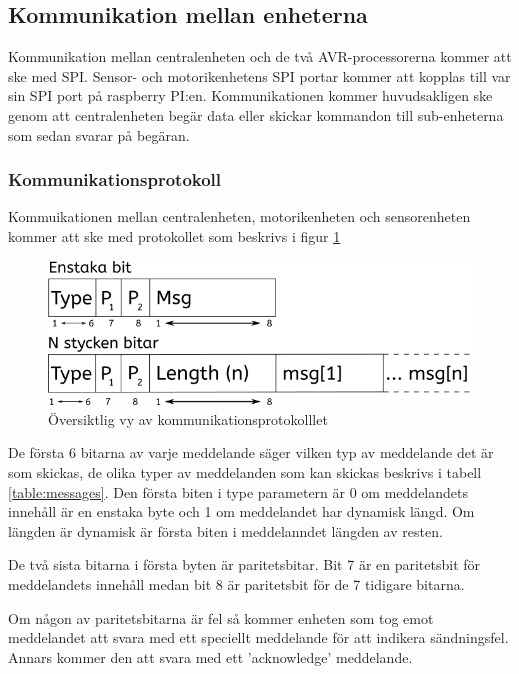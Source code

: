 \documentclass[a4paper,titlepage,12pt]{article}
\begin{document}
	\subsection{Kommunikation mellan enheterna}
	Kommunikation mellan centralenheten och de två AVR-processorerna kommer att ske
	med SPI. Sensor- och motorikenhetens SPI portar kommer att kopplas till var sin
	SPI port på raspberry PI:en. Kommunikationen kommer huvudsakligen ske genom  att
	centralenheten begär data eller skickar kommandon till sub-enheterna som
	sedan svarar på begäran.  

	\subsubsection*{Kommunikationsprotokoll}
	\label{ssub:Kommunikationsprotokoll}
	Kommuikationen mellan centralenheten, motorikenheten och sensorenheten kommer att ske 
	med protokollet som beskrivs i figur \ref{fig:kommunikation1}

	\begin{figure}[h]
		\centering
		\includegraphics[width=0.5\linewidth]{images/communication_protocol1.png}
		\caption{Översiktlig vy av kommunikationsprotokolllet}
		\label{fig:kommunikation1}
	\end{figure}

	De första 6 bitarna av varje meddelande säger vilken typ av meddelande det är som
	skickas, de olika typer av meddelanden som kan skickas beskrivs i tabell 
	\ref{table:messages}. Den första biten i type parametern är 0 om meddelandets
	innehåll är en enstaka byte och 1 om meddelandet har dynamisk längd. Om längden
	är dynamisk är första biten i meddelanndet längden av resten.

	De två sista bitarna i första byten är paritetsbitar. Bit 7 är en  paritetsbit
	för meddelandets innehåll medan bit 8 är paritetsbit för de 7 tidigare bitarna.

	Om någon av paritetsbitarna är fel så kommer enheten som tog emot meddelandet att svara
	med ett speciellt meddelande för att indikera sändningsfel. Annars kommer den 
	att svara med ett 'acknowledge' meddelande.
\end{document}
